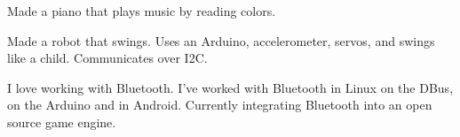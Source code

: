 \documentclass[]{deedy-resume-openfont}
\begin{document}
\begin{minipage}[t]{0.66\textwidth}
    Made a piano that plays music by reading colors.
    \sectionsep

    Made a robot that swings. Uses an Arduino, accelerometer, servos, and swings like a child. Communicates over I2C.
    \sectionsep

    I love working with Bluetooth. I've worked with Bluetooth in Linux on the DBus, on the Arduino and in Android. Currently integrating Bluetooth into an open source game engine.

\end{minipage} 
\end{document}
